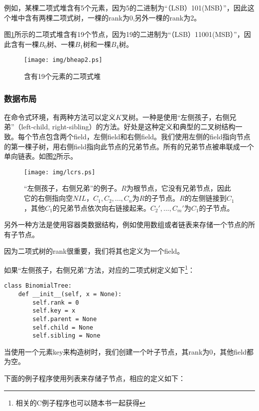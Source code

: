 \documentclass[UTF8]{article}
\begin{document}
例如，某棵二项式堆含有5个元素，因为5的二进制为“（LSB）101(MSB）”，因此这个堆中含有两棵二项式树，一棵的rank为0,另外一棵的rank为2。

图\ref{fig:bheap2}所示的二项式堆含有19个节点，因为19的二进制为“（LSB）11001(MSB）”，因此含有一棵$B_0$树、一棵$B_1$树和一棵$B_4$树。

\begin{figure}[htbp]
  \centering
  \texttt{[image: img/bheap2.ps]}
  \caption{含有19个元素的二项式堆} \label{fig:bheap2}
\end{figure}

\subsubsection{数据布局}

在命令式环境，有两种方法可以定义$K$叉树。一种是使用“左侧孩子，右侧兄弟”（left-child, right-sibling）的方法\cite{CLRS}。好处是这种定义和典型的二叉树结构一致。每个节点包含两个field，左侧field和右侧field。我们使用左侧的field指向节点的第一棵子树，用右侧field指向此节点的兄弟节点。所有的兄弟节点被串联成一个单向链表。如图\ref{fig:lcrs}所示。

\begin{figure}[htbp]
  \centering
  \texttt{[image: img/lcrs.ps]}
  \caption{“左侧孩子，右侧兄弟”的例子。$R$为根节点，它没有兄弟节点，因此它的右侧指向空$NIL$，$C_1, C_2, ..., C_n$为$R$的子节点。$R$的左侧链接到$C_1$，其他$C_1$的兄弟节点依次向右链接起来。$C_2', ..., C_m'$为$C_1$的子节点。} \label{fig:lcrs}
\end{figure}

另外一种方法是使用容器类数据结构，例如使用数组或者链表来存储一个节点的所有子节点。

因为二项式树的rank很重要，我们将其也定义为一个field。

如果“左侧孩子，右侧兄弟”方法，对应的二项式树定义如下\footnote{相关的C例子程序也可以随本书一起获得}：

\lstset{language=Python}
\begin{lstlisting}
class BinomialTree:
    def __init__(self, x = None):
        self.rank = 0
        self.key = x
        self.parent = None
        self.child = None
        self.sibling = None
\end{lstlisting}

当使用一个元素key来构造树时，我们创建一个叶子节点，其rank为0，其他field都为空。

下面的例子程序使用列表来存储子节点，相应的定义如下：
\end{document}
